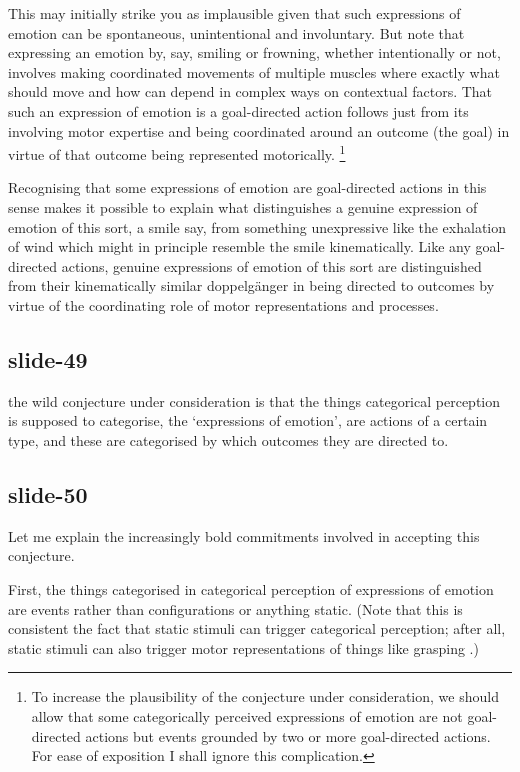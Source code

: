 \documentclass[12pt,\papersize]{extarticle}
\begin{document}
This may initially strike you as implausible given that such expressions of emotion can be spontaneous, unintentional and involuntary.
But note that expressing an emotion by, say, smiling or frowning,
whether intentionally or not,
involves making coordinated movements of multiple muscles
where exactly what should move and how can depend in complex ways on  contextual factors.
That such an expression of emotion is a goal-directed action follows just from its involving motor expertise
and being coordinated around an outcome (the goal) in virtue of that outcome being represented motorically.%
\footnote{
To increase the plausibility of the conjecture under consideration, we should allow that some categorically perceived expressions of emotion are not goal-directed actions but events grounded by two or more goal-directed actions.
For ease of exposition I shall ignore this complication.
}

Recognising that some expressions of emotion are goal-directed actions in this sense makes it possible to explain
what distinguishes a genuine expression of emotion of this sort, a smile say, from something unexpressive like the exhalation of wind which might in principle resemble the smile kinematically.
Like any goal-directed actions, genuine expressions of emotion of this sort are distinguished from
their kinematically similar doppelgänger
in being directed to outcomes by virtue of the coordinating role of motor representations and processes.

\subsection{slide-49}
the wild conjecture under consideration is that the things categorical perception is supposed to categorise, the ‘expressions of emotion’, are actions of a certain type, and these are categorised by which outcomes they are directed to.

\subsection{slide-50}
Let me explain the increasingly bold commitments involved in accepting this conjecture.

First, the things categorised in categorical perception of expressions of emotion are events rather than configurations or anything static.
(Note that this is consistent the fact that static stimuli can trigger categorical perception; after all, static stimuli can also trigger motor representations of things like grasping \citep{borghi:2007_are}.)
\end{document}
